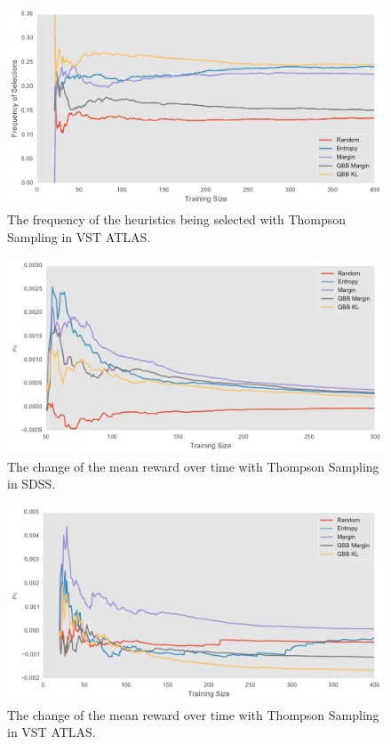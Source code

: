 \begin{figure}[tbp]
	\centering
	\includegraphics[width=\textwidth]{figures/bandit_sel_vst}
	\caption{The frequency of the heuristics being selected with Thompson Sampling in VST ATLAS.}
	\label{fig:bandit_sel_vst} 
\end{figure}


\begin{figure}[tbp]
	\centering
	\includegraphics[width=\textwidth]{figures/bandit_mu_sdss}
	\caption{The change of the mean reward over time with Thompson Sampling in SDSS.}
	\label{fig:bandit_mu_sdss} 
\end{figure}

\begin{figure}[tbp]
	\centering
	\includegraphics[width=\textwidth]{figures/bandit_mu_vst}
	\caption{The change of the mean reward over time with Thompson Sampling in VST ATLAS.}
	\label{fig:bandit_mu_vst} 
\end{figure}

